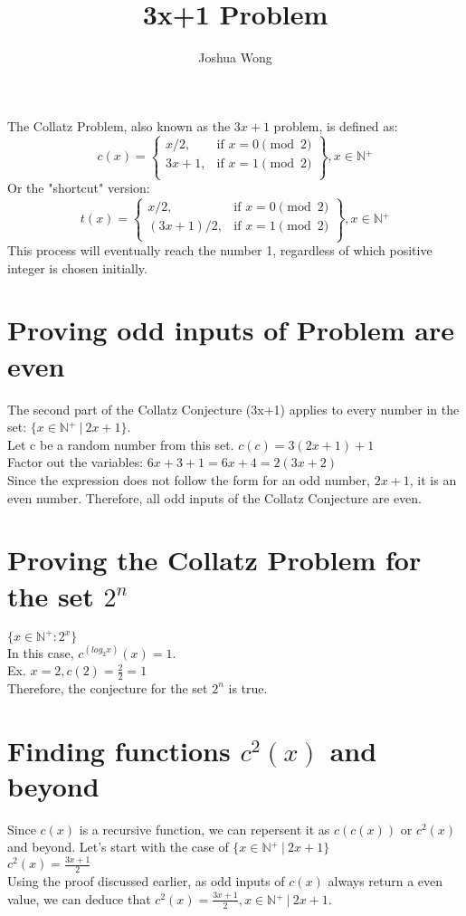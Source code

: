 \documentclass[a4paper,10pt]{article}
\title{3x+1 Problem}
\author{Joshua Wong}
\begin{document}
\maketitle
  The Collatz Problem, also known as the \(3x+1\) problem, is defined as:
  \[
    c(x) = \left.
    \begin{cases}
        x/2, & \text{if } x = 0 {\pmod {2}}\\
        3x+1, & \text{if } x = 1 {\pmod {2}} \\
        \end{cases}
    \right\}, x \in \mathbb{N{^+}}
  \]
  Or the "shortcut" version:
  \[
    t(x) = \left.
    \begin{cases}
        x/2, & \text{if } x = 0 {\pmod {2}}\\
        (3x+1)/2, & \text{if } x = 1 {\pmod {2}} \\
        \end{cases}
    \right\}, x \in \mathbb{N{^+}}
  \]
  This process will eventually reach the number 1, regardless of which positive integer is chosen initially.
  \section{Proving odd inputs of Problem are even}
  The second part of the Collatz Conjecture (3x+1) applies to every number in the set: \(\{ x \in \mathbb{N{^+}} \ | \ 2x+1 \}\). \\
  Let c be a random number from this set. \(c(c) = 3(2x+1)+1 \) \\
  Factor out the variables: \(6x+3+1 = 6x+4 = 2(3x+2)\) \\
  Since the expression does not follow the form for an odd number, \(2x+1\), it is an even number.
  Therefore, all odd inputs of the Collatz Conjecture are even.
  \section{Proving the Collatz Problem for the set $2^{n}$}
  \(\{x \in \mathbb{N{^+}}: 2{^x}\}\) \\
  In this case, \(c^{(log_2{x})}(x) = 1\). \\
  Ex. \(x = 2, c(2) = \frac{2}{2} = 1\) \\
  Therefore, the conjecture for the set $2^{n}$ is true.
  \section{Finding functions $c{^2}(x)$ and beyond}
  Since $c(x)$ is a recursive function, we can repersent it as $c(c(x))$ or $c{^2}(x)$ and beyond.
  Let's start with the case of \(\{x \in \mathbb{N{^+}} \ | \ 2x+1\}\) \\
  \(c^2(x) = \frac{3x+1}{2}\) \\
  Using the proof discussed earlier, as odd inputs of \(c(x)\) always return a even value, we can deduce that \(c^2(x) = \frac{3x+1}{2}, x \in \mathbb{N{^+}} \ | \ 2x+1\).
\end{document}
